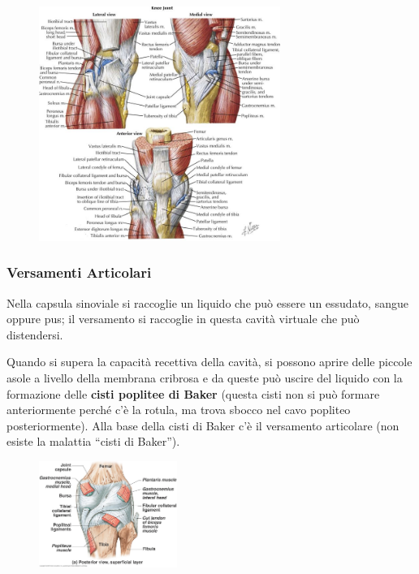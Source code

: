 \begin{figure}[!ht]
\centering
\includegraphics[width=0.7\textwidth]{009/image2.jpeg}
\end{figure}

\subsubsection{Versamenti Articolari}

Nella capsula sinoviale si raccoglie un liquido che può essere un essudato, sangue oppure pus; il versamento si raccoglie in questa cavità virtuale che può distendersi.

Quando si supera la capacità recettiva della cavità, si possono aprire delle piccole asole a livello della membrana cribrosa e da queste può uscire del liquido con la formazione delle \textbf{cisti poplitee di Baker} (questa cisti non si può formare anteriormente perché c'è la rotula, ma trova sbocco nel cavo popliteo posteriormente). Alla base della cisti di Baker c'è il versamento articolare (non esiste la malattia ``cisti di Baker'').

\begin{figure}[!ht]
\centering
\includegraphics[width=0.4\textwidth]{009/image3.jpeg}
\end{figure}

